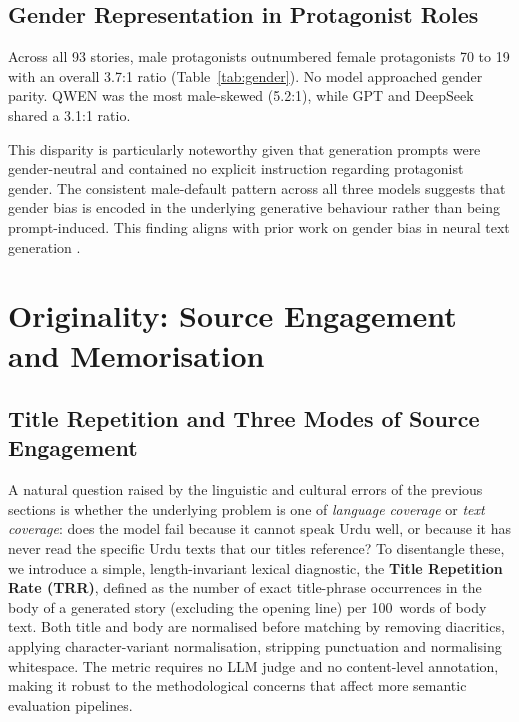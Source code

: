 \documentclass[11pt]{article}
\begin{document}
\subsection{Gender Representation in 
              Protagonist Roles}
\label{subsec:gender_bias}
Across all 93 stories, male protagonists
outnumbered female protagonists 70 to 19 with
an overall 3.7:1 ratio
(Table~\ref{tab:gender}). No model approached gender
parity. QWEN was the most male-skewed (5.2:1), while
GPT and DeepSeek shared a 3.1:1 ratio. 

This disparity is particularly noteworthy given that
generation prompts were gender-neutral and contained
no explicit instruction regarding protagonist gender.
The consistent male-default pattern across all three
models suggests that gender bias is encoded in the
underlying generative behaviour rather than being
prompt-induced. This
finding aligns with prior work on gender bias in
neural text generation
\citep{genderbiasllmgenerated2025,VANBLERCK2025100972}.


\section{Originality: Source Engagement and Memorisation}
\subsection{Title Repetition and Three Modes of Source Engagement}
\label{subsec:title_repetition}

A natural question raised by the linguistic and cultural
errors of the previous sections is whether the underlying
problem is one of \emph{language coverage} or \emph{text
coverage}: does the model fail because it cannot speak Urdu
well, or because it has never read the specific Urdu texts
that our titles reference? To disentangle these, we
introduce a simple, length-invariant lexical diagnostic,
the \textbf{Title Repetition Rate (TRR)}, defined as the
number of exact title-phrase occurrences in the body of a
generated story (excluding the opening line) per 100~words
of body text. Both title and body are normalised before
matching by removing diacritics, applying character-variant
normalisation, stripping punctuation and normalising
whitespace. The metric requires no LLM judge and no
content-level annotation, making it robust to the
methodological concerns that affect more semantic
evaluation pipelines.
\end{document}
